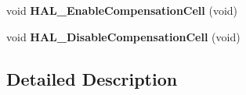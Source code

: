\begin{DoxyCompactItemize}
\item 
void {\bfseries H\+A\+L\+\_\+\+Enable\+Compensation\+Cell} (void)\hypertarget{group___h_a_l___exported___functions___group2_ga20b6ca07582e10aec5e15ad2fda7dfc1}{}\label{group___h_a_l___exported___functions___group2_ga20b6ca07582e10aec5e15ad2fda7dfc1}

\item 
void {\bfseries H\+A\+L\+\_\+\+Disable\+Compensation\+Cell} (void)\hypertarget{group___h_a_l___exported___functions___group2_ga653f1166b0e37afd40372550d806e667}{}\label{group___h_a_l___exported___functions___group2_ga653f1166b0e37afd40372550d806e667}

\end{DoxyCompactItemize}


\subsection{Detailed Description}
